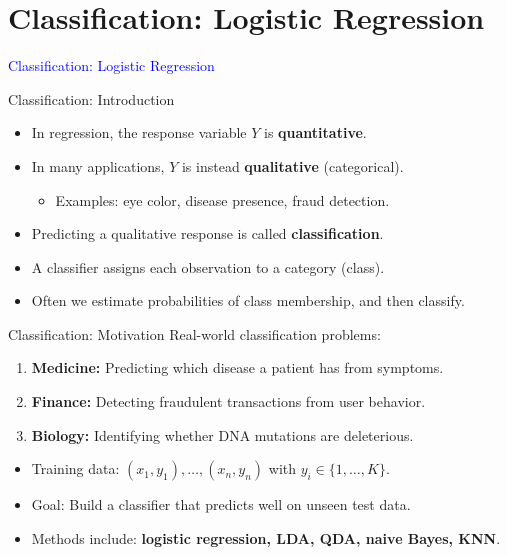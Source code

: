 \documentclass[../../main.tex]{subfiles}
\begin{document}
\graphicspath{{figures/}{lectures/03_logistic/figures/}}
\section{Classification: Logistic Regression}
\begin{frame}[plain]
  \vfill\begin{center}{\Huge \textcolor{blue}{Classification: Logistic Regression}}\end{center}\vfill
\end{frame}



\begin{frame}{Classification: Introduction}
\begin{itemize}
    \item In regression, the response variable $Y$ is \textbf{quantitative}.  
    \item In many applications, $Y$ is instead \textbf{qualitative} (categorical).  
    \begin{itemize}
        \item Examples: eye color, disease presence, fraud detection.  
    \end{itemize}
    \item Predicting a qualitative response is called \textbf{classification}.  
    \item A classifier assigns each observation to a category (class).  
    \item Often we estimate probabilities of class membership, and then classify.  
\end{itemize}
\end{frame}

\begin{frame}{Classification: Motivation}
Real-world classification problems:
\begin{enumerate}
    \item \textbf{Medicine:} Predicting which disease a patient has from symptoms.  
    \item \textbf{Finance:} Detecting fraudulent transactions from user behavior.  
    \item \textbf{Biology:} Identifying whether DNA mutations are deleterious.  
\end{enumerate}
\begin{itemize}
    \item Training data: $(x_1,y_1), \dots, (x_n,y_n)$ with $y_i \in \{1,\dots,K\}$.  
    \item Goal: Build a classifier that predicts well on unseen test data.  
    \item Methods include: \textbf{logistic regression, LDA, QDA, naive Bayes, KNN}.  
\end{itemize}
\end{frame}
\end{document}
